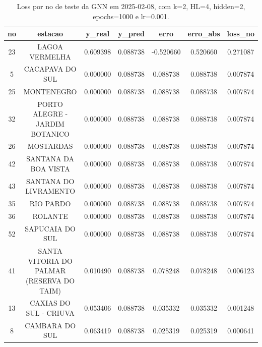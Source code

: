 \begin{table}[h]
\centering
\caption{Loss por no de teste da GNN em 2025-02-08, com k=2, HL=4, hidden=2, epochs=1000 e lr=0.001.}
\label{tab:gnn_loss_k2_hl4_h2_e1000_d20250208}
\begin{tabular}{ccccccc}
\toprule
no & estacao & y\_real & y\_pred & erro & erro\_abs & loss\_no \\
\midrule
23 & LAGOA VERMELHA & 0.609398 & 0.088738 & -0.520660 & 0.520660 & 0.271087 \\
5 & CACAPAVA DO SUL & 0.000000 & 0.088738 & 0.088738 & 0.088738 & 0.007874 \\
25 & MONTENEGRO & 0.000000 & 0.088738 & 0.088738 & 0.088738 & 0.007874 \\
32 & PORTO ALEGRE - JARDIM BOTANICO & 0.000000 & 0.088738 & 0.088738 & 0.088738 & 0.007874 \\
26 & MOSTARDAS & 0.000000 & 0.088738 & 0.088738 & 0.088738 & 0.007874 \\
42 & SANTANA DA BOA VISTA & 0.000000 & 0.088738 & 0.088738 & 0.088738 & 0.007874 \\
43 & SANTANA DO LIVRAMENTO & 0.000000 & 0.088738 & 0.088738 & 0.088738 & 0.007874 \\
35 & RIO PARDO & 0.000000 & 0.088738 & 0.088738 & 0.088738 & 0.007874 \\
36 & ROLANTE & 0.000000 & 0.088738 & 0.088738 & 0.088738 & 0.007874 \\
52 & SAPUCAIA DO SUL & 0.000000 & 0.088738 & 0.088738 & 0.088738 & 0.007874 \\
41 & SANTA VITORIA DO PALMAR (RESERVA DO TAIM) & 0.010490 & 0.088738 & 0.078248 & 0.078248 & 0.006123 \\
13 & CAXIAS DO SUL - CRIUVA & 0.053406 & 0.088738 & 0.035332 & 0.035332 & 0.001248 \\
8 & CAMBARA DO SUL & 0.063419 & 0.088738 & 0.025319 & 0.025319 & 0.000641 \\
\bottomrule
\end{tabular}
\end{table}
